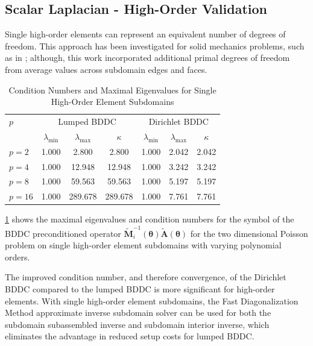 \documentclass[review]{siamart190516}
\begin{document}
\subsection{Scalar Laplacian - High-Order Validation}\label{sec:highordervalidate}

Single high-order elements can represent an equivalent number of degrees of freedom.
This approach has been investigated for solid mechanics problems, such as in \cite{pavarino2010bddc}; although, this work incorporated additional primal degrees of freedom from average values across subdomain edges and faces.

\begin{table}[ht!]
\begin{center}
\begin{tabular}{l ccc ccc}
  \toprule
  $p$  &  \multicolumn{3}{c}{Lumped BDDC}  &  \multicolumn{3}{c}{Dirichlet BDDC}  \\
                      &  $\lambda_{\text{min}}$  &  $\lambda_{\text{max}}$  &  $\kappa$ & $\lambda_{\text{min}}$  &  $\lambda_{\text{max}}$ & $\kappa$  \\
  \toprule
  $p = 2$   &  1.000  &    2.800  &    2.800  &  1.000  &  2.042  &  2.042  \\
  $p = 4$   &  1.000  &   12.948  &   12.948  &  1.000  &  3.242  &  3.242  \\
  $p = 8$   &  1.000  &   59.563  &   59.563  &  1.000  &  5.197  &  5.197  \\
  $p = 16$  &  1.000  &  289.678  &  289.678  &  1.000  &  7.761  &  7.761  \\
  \bottomrule
\end{tabular}
\end{center}
\caption{Condition Numbers and Maximal Eigenvalues for Single High-Order Element Subdomains}
\label{table:high_order_element_bddc}
\end{table}

\cref{table:high_order_element_bddc} shows the maximal eigenvalues and condition numbers for the symbol of the BDDC preconditioned operator $\tilde{\mathbf{M}}^{-1}_i \left( \boldsymbol{\theta} \right) \tilde{\mathbf{A}} \left( \boldsymbol{\theta} \right)$ for the two dimensional Poisson problem on single high-order element subdomains with varying polynomial orders.

The improved condition number, and therefore convergence, of the Dirichlet BDDC compared to the lumped BDDC is more significant for high-order elements.
With single high-order element subdomains, the Fast Diagonalization Method approximate inverse subdomain solver can be used for both the subdomain subassembled inverse and subdomain interior inverse, which eliminates the advantage in reduced setup costs for lumped BDDC.
\end{document}
